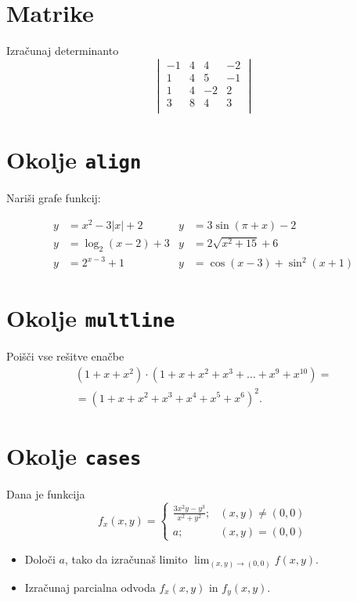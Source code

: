 \documentclass[a4paper,12pt]{article}
\begin{document}
\section*{Matrike}
Izračunaj determinanto
\[
\begin{vmatrix}
    -1 & 4 & 4 & -2 \\
    1 & 4 & 5 & -1 \\
    1 & 4 & -2 & 2 \\
    3 & 8 & 4 & 3 \\
\end{vmatrix}
\]
\section*{Okolje \texttt{align}}
Nariši grafe funkcij:

\begin{align*}
y &= x^2 - 3|x| + 2   
&
y &= 3 \sin(\pi+x) - 2
\\
y &= \log_2(x-2) + 3  
&
y &= 2 \sqrt{x^2+15} + 6
\\
y &= 2^{x-3} + 1      
&
y &= \cos(x-3) + \sin^2(x+1)
\end{align*}


\section*{Okolje \texttt{multline}}
Poišči vse rešitve enačbe
\begin{multline*}
(1+x+x^2) \cdot (1+x+x^2+x^3+\ldots+x^9+x^{10}) =\\
=(1+x+x^2+x^3+x^4+x^5+x^6)^2.
\end{multline*}

\section*{Okolje \texttt{cases}}
Dana je funkcija
\[f_x(x,y)=
\begin{cases}
   \frac{3x^2y-y^3}{x^2+y^2};&(x,y)\neq(0,0)\\
   a;& (x,y)=(0,0) 
\end{cases}
\]
\begin{itemize}
\item Določi \(a\), tako da izračunaš limito \( \lim_{(x,y)\to(0,0)} f(x,y) \).
\item Izračunaj parcialna odvoda \(f_x(x,y)\) in \(f_y(x,y)\).
\end{itemize}
\end{document}
